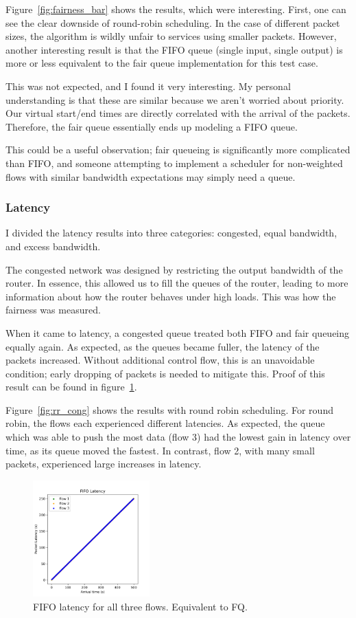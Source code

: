 \documentclass[conference]{IEEEtran}
\begin{document}
Figure~\ref{fig:fairness_bar} shows the results, which were interesting.
First, one can see the clear downside of round-robin scheduling.
In the case of different packet sizes, the algorithm is wildly unfair to services using smaller packets.
However, another interesting result is that the FIFO queue (single input, single output) is more or less equivalent to
the fair queue implementation for this test case.

This was not expected, and I found it very interesting.
My personal understanding is that these are similar because we aren't worried about priority.
Our virtual start/end times are directly correlated with the arrival of the packets.
Therefore, the fair queue essentially ends up modeling a FIFO queue.

This could be a useful observation; fair queueing is significantly more complicated than FIFO, and someone attempting to
implement a scheduler for non-weighted flows with similar bandwidth expectations may simply need a queue.

    \subsubsection{Latency}
I divided the latency results into three categories: congested, equal bandwidth, and excess bandwidth.

The congested network was designed by restricting the output bandwidth of the router.
In essence, this allowed us to fill the queues of the router, leading to more information about how the router behaves
under high loads.
This was how the fairness was measured.

When it came to latency, a congested queue treated both FIFO and fair queueing equally again.
As expected, as the queues became fuller, the latency of the packets increased.
Without additional control flow, this is an unavoidable condition; early dropping of packets is needed to mitigate this.
Proof of this result can be found in figure~\ref{fig:fifo_cong}.

Figure~\ref{fig:rr_cong} shows the results with round robin scheduling.
For round robin, the flows each experienced different latencies.
As expected, the queue which was able to push the most data (flow 3) had the lowest gain in latency over time, as its
queue moved the fastest.
In contrast, flow 2, with many small packets, experienced large increases in latency.

\begin{figure}[htbp]
    \centering
    \includegraphics[width=0.4\textwidth]{../img/fifo_latency}
    \caption{FIFO latency for all three flows. Equivalent to FQ.}
    \label{fig:fifo_cong}
\end{figure}
\end{document}
